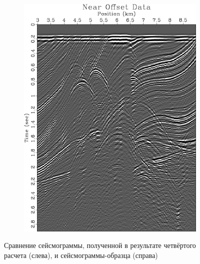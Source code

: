 \documentclass{article}
\begin{document}
\begin{figure}[tb]
\begin{subfigure}{.5\textwidth}\includegraphics[width=\textwidth,trim=0 0 0 2cm]{pic/report_april/nearOffset}\end{subfigure}%
\caption{Сравнение сейсмограммы, полученной в результате четвёртого расчета (слева), и сейсмограммы-образца (справа)} \label{marmresult4}
\end{figure}
%
\end{document}
